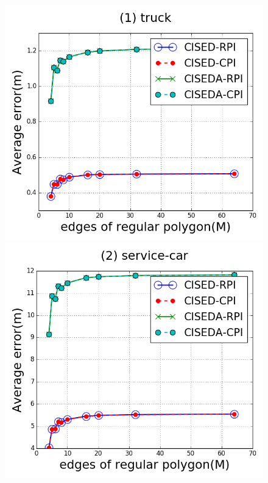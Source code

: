 \begin{figure}[tb!]
\centering
\includegraphics[scale = 0.250]{figures/Exp-M-e-20-error-truck.png}
\includegraphics[scale = 0.250]{figures/Exp-M-e-20-error-service.png}

\end{figure}
